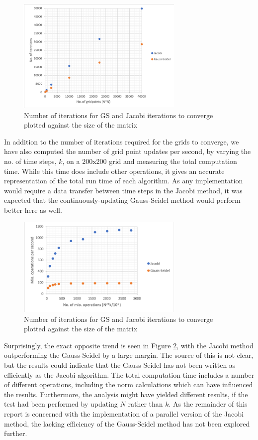 \documentclass{article}
\begin{document}
\begin{figure}
    \centering
    \includegraphics[width=8cm]{figures/question2.png}
    \caption{Number of iterations for GS and Jacobi iterations to converge plotted against the size of the matrix}
    \label{fig:question2}
\end{figure}
In addition to the number of iterations required for the grids to converge, we have also computed the number of grid point updates per second, by varying the no. of time steps, $k$, on a 200x200 grid and measuring the total computation time. While this time does include other operations, it gives an accurate representation of the total run time of each algorithm. As any implementation would require a data transfer between time steps in the Jacobi method, it was expected that the continuously-updating Gauss-Seidel method would perform better here as well.\\

\begin{figure}[!h]
    \centering
    \includegraphics[width=8cm]{figures/question2b.png}
    \caption{Number of iterations for GS and Jacobi iterations to converge plotted against the size of the matrix}
    \label{fig:question2b}
\end{figure}
Surprisingly, the exact opposite trend is seen in Figure \ref{fig:question2b}, with the Jacobi method outperforming the Gauss-Seidel by a large margin. The source of this is not clear, but the results could indicate that the Gauss-Seidel has not been written as efficiently as the Jacobi algorithm. The total computation time includes a number of different operations, including the norm calculations which can have influenced the results. Furthermore, the analysis might have yielded different results, if the test had been performed by updating $N$ rather than $k$. As the remainder of this report is concerned with the implementation of a parallel version of the Jacobi method, the lacking efficiency of the Gauss-Seidel method has not been explored further.
\end{document}
